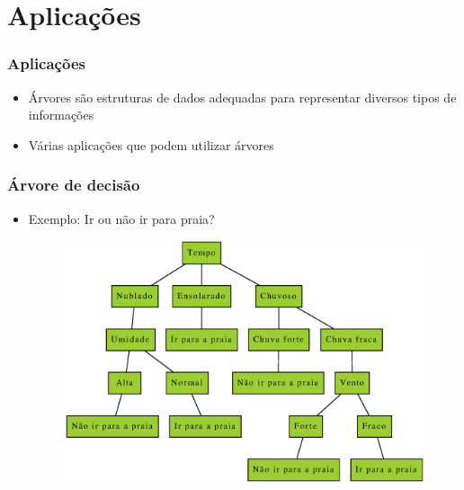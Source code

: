 \documentclass[aspectratio=169]{beamer}
\begin{document}
\section{Aplicações}

\begin{frame}\frametitle{Aplicações}
\begin{itemize}
	\item Árvores são estruturas de dados adequadas para representar diversos tipos de informações
	\item Várias aplicações que podem utilizar árvores
\end{itemize}
\end{frame}

\begin{frame}\frametitle{Árvore de decisão}
\begin{itemize}
	\item Exemplo: Ir ou não ir para praia?
\begin{figure}[h]
	\centering
	\includegraphics[height=0.65\paperheight]{imagens/arvore_de_decisao.eps}
\end{figure}
\end{itemize}
\end{frame}
\end{document}
